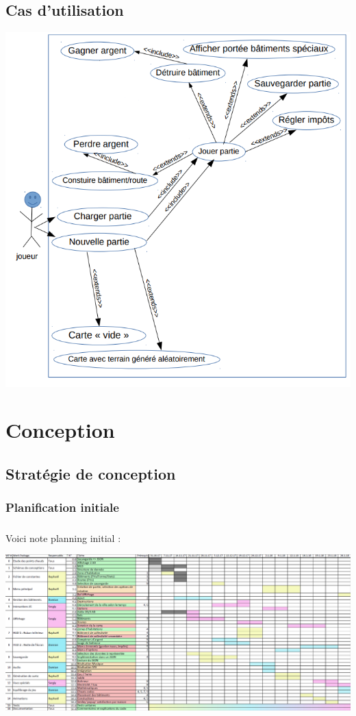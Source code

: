 \documentclass[a4paper,10pt,openany,oneside]{report}
\begin{document}
\section{Cas d'utilisation}
\includegraphics[width=\textwidth]{img/usecase.png}

\chapter{Conception}
\thispagestyle{headings}
\section{Stratégie de conception}
\subsection{Planification initiale}
\paragraph{}
Voici note planning initial :
\begin{center}
\includegraphics[width=1.1\textwidth]{img/planning_initial.png}
\end{center}
\end{document}
